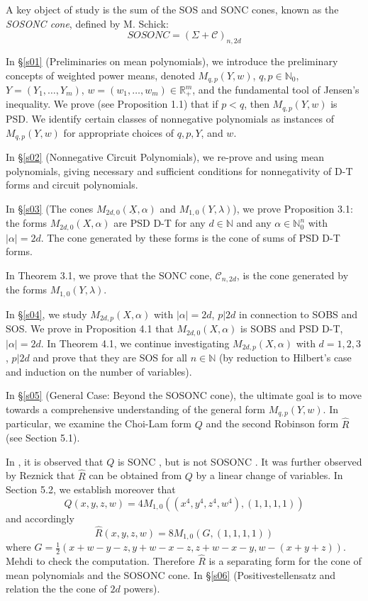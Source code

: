 \documentclass{article}
\begin{document}
A key object of study is the sum of the SOS and SONC cones, known as the \emph{SOSONC cone}, defined by M. Schick:
\[
   SOSONC = (\Sigma + \mathcal{C})_{n,2d}
\]

In \S\ref{s01} (Preliminaries on mean polynomials), we introduce the preliminary concepts of weighted power means, 
denoted $M_{q,p}(Y,w)$, $q, p \in \mathbb{N}_0$, $Y = (Y_1, \dots, Y_m)$, $w = (w_1, \dots, w_m) \in \mathbb{R}_+^m$, and 
the fundamental tool of Jensen's inequality. We prove (see Proposition 1.1) that if $p < q$, then $M_{q,p}(Y,w)$ is PSD. 
We identify certain classes of nonnegative polynomials as instances of $M_{q,p}(Y,w)$ for appropriate choices of $q, p, Y$, 
and $w$.

In \S\ref{s02} (Nonnegative Circuit Polynomials), we re-prove \cite[Corolary 2.2]{GM01} and \cite[Theorem 2.4]{DIdW01} 
using mean polynomials, giving necessary and sufficient conditions for nonnegativity of D-T forms and circuit polynomials.

In \S\ref{s03} (The cones $M_{2d,0}(\underline{X},\alpha)$ and $M_{1,0}(Y,\lambda)$), we prove Proposition 3.1: the 
forms $M_{2d,0}(X,\alpha)$ are PSD D-T for any $d \in \mathbb{N}$ and any $\alpha \in \mathbb{N}_0^n$ with $|\alpha| = 2d$. 
The cone generated by these forms is the cone of sums of PSD D-T forms.

In Theorem 3.1, we prove that the SONC cone, $\mathcal{C}_{n,2d}$, is the cone generated by the forms $M_{1,0}(Y,\lambda)$.

In \S\ref{s04}, we study $M_{2d,p}(X,\alpha)$ with $|\alpha| = 2d$, $p | 2d$ in connection to SOBS and SOS. We prove 
in Proposition 4.1 that $M_{2d,0}(X,\alpha)$ is SOBS and PSD D-T, $|\alpha| = 2d$. In Theorem 4.1, we continue investigating 
$M_{2d,p}(X,\alpha)$ with $d = 1, 2, 3$, $p | 2d$ and prove that they are SOS for all $n \in \mathbb{N}$ (by reduction to 
Hilbert's case and induction on the number of variables).

In \S\ref{s05} (General Case: Beyond the SOSONC cone), the ultimate goal is to move towards a comprehensive 
understanding of the general form $M_{q,p}(Y,w)$. In particular, we examine the Choi-Lam form $Q$ and the second Robinson 
form $\hat{R}$ (see Section 5.1).

In \cite{MSc01}, it is observed that $Q$ is SONC \cite[page 31]{MSc01}, but is not SOSONC \cite[Lemma 4.2.5, page 107]{MSc01}. 
It was further observed by Reznick \cite{Rez07} that $\hat{R}$ can be obtained from $Q$ by a linear change of variables. 
In Section 5.2, we establish moreover that
\[
   Q(x, y, z, w) = 4 M_{1,0}((x^4, y^4, z^4, w^4), (1, 1, 1, 1))
\]
and accordingly 
$$\hat{R}(x,y,z,w)=8M_{1,0}(G, (1,1,1,1))$$
where $G=\frac{1}{2}(x+w-y-z, y+w-x-z, z+w-x-y, w-(x+y+z))$. Mehdi to check the computation.
Therefore $\hat{R}$ is a separating form for the cone of mean polynomials and the SOSONC cone.
In \S\ref{s06} (Positivestellensatz and relation the the cone of $2d$ powers).
 
\end{document}
